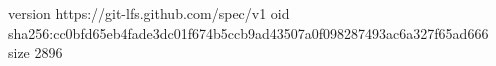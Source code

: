 version https://git-lfs.github.com/spec/v1
oid sha256:cc0bfd65eb4fade3dc01f674b5ccb9ad43507a0f098287493ac6a327f65ad666
size 2896
